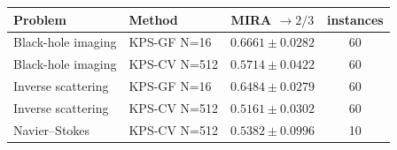 \begin{tabular}{llcc}
\toprule
Problem & Method & MIRA $\to 2/3$ & instances \\
\midrule
Black-hole imaging & KPS-GF N=16 & $0.6661 \pm 0.0282$ & 60 \\
Black-hole imaging & KPS-CV N=512 & $0.5714 \pm 0.0422$ & 60 \\
Inverse scattering & KPS-GF N=16 & $0.6484 \pm 0.0279$ & 60 \\
Inverse scattering & KPS-CV N=512 & $0.5161 \pm 0.0302$ & 60 \\
Navier--Stokes & KPS-CV N=512 & $0.5382 \pm 0.0996$ & 10 \\
\bottomrule
\end{tabular}
